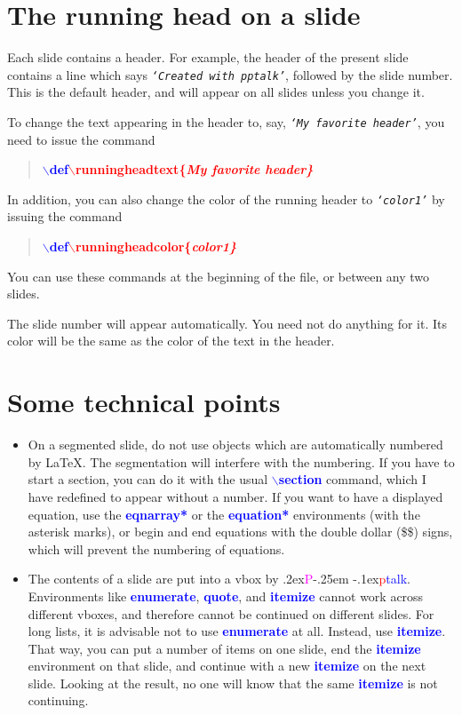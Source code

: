 \documentclass[12pt]{article}
\def\pptalk{{
\raise.2ex\hbox{\textcolor{magenta}P}\kern-.25em
\raise-.1ex\hbox{\textcolor{red}p}\textcolor{blue}{talk}}}
\def\ecomm#1{{\textcolor{blue}{$\backslash${\bf #1}}}}
\def\noncomm#1{{\textcolor{blue}{\bf #1}}}
\def\comm#1{{\textcolor{red}{$\backslash${\bf #1}}}}
\def\txtem#1{\texttt{\sl `#1'}}
\begin{document}

\beginslide

\section{The running head on a slide}

Each slide contains a header.  For example, the header of the present
slide contains a line which says \txtem{Created with pptalk}, followed
by the slide number.  This is the default header, and will appear on
all slides unless you change it. 

To change the text appearing in the header to, say, \txtem{My favorite
header}, you need to issue the
command 
%
\begin{quote}
\ecomm{def\comm{runningheadtext\{\em My favorite
header\}}}
\end{quote}
%
In addition, you can also change the color of the running header to
\txtem{color1} by issuing the command
%
\begin{quote}
\ecomm{def\comm{runningheadcolor\{\em color1\}}}
\end{quote}
%
You can use these commands at the beginning of the file, or between
any two slides.

The slide number will appear automatically.  You need not do anything
for it.  Its color will be the same as the color of the text in the
header. 

\endslide


\beginslide
\section{Some technical points}
\begin{itemize}

\item On a segmented slide, do not use objects which are automatically
numbered by \LaTeX.  The segmentation will interfere with the
numbering.  If you have to start a section, you can do it with the
usual \ecomm{section} command, which I have redefined to appear
without a number.  If you want to have a displayed equation, use the
\noncomm{eqnarray*} or the \noncomm{equation*} environments (with the
asterisk marks), or begin and end equations with the double dollar
(\$\$) signs, which will prevent the numbering of equations.

\item The contents of a slide are put into a vbox by \pptalk.
Environments like \noncomm{enumerate}, \noncomm{quote}, and
\noncomm{itemize} cannot work across different vboxes, and therefore
cannot be continued on different slides.  For long lists, it is
advisable not to use \noncomm{enumerate} at all.  Instead, use
\noncomm{itemize}.  That way, you can put a number of items on one
slide, end the \noncomm{itemize} environment on that slide, and
continue with a new \noncomm{itemize} on the next slide.  Looking at
the result, no one will know that the same \noncomm{itemize} is not
continuing.

\end{itemize}
\end{document}
